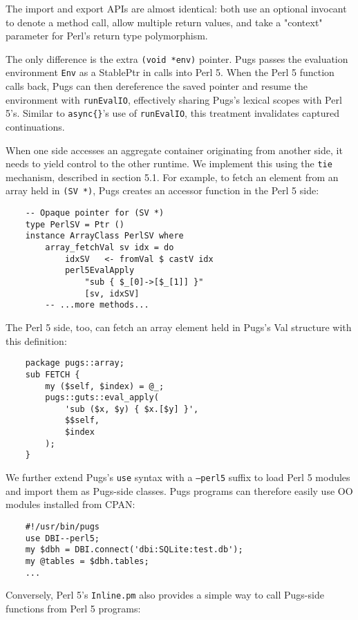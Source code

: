 \documentclass[]{sigplanconf}
\newcommand{\code}[1]{\texttt{#1}}
\begin{document}
The import and export APIs are almost identical: both use an optional invocant
to denote a method call, allow multiple return values, and take a "context"
parameter for Perl's return type polymorphism.

The only difference is the extra \code{(void *env)} pointer.  Pugs passes the
evaluation environment \code{Env} as a StablePtr in calls into Perl 5.  When
the Perl 5 function calls back, Pugs can then dereference the saved pointer and
resume the environment with \code{runEvalIO}, effectively sharing Pugs's
lexical scopes with Perl 5's.  Similar to \code{async\{\}}'s use of
\code{runEvalIO}, this treatment invalidates captured continuations.

When one side accesses an aggregate container originating from another side, it
needs to yield control to the other runtime.  We implement this using the
\code{tie} mechanism, described in section 5.1.  For example, to fetch an
element from an array held in \code{(SV *)}, Pugs creates an accessor function
in the Perl 5 side:

\begin{lstlisting}
    -- Opaque pointer for (SV *)
    type PerlSV = Ptr ()
    instance ArrayClass PerlSV where
        array_fetchVal sv idx = do
            idxSV   <- fromVal $ castV idx
            perl5EvalApply
                "sub { $_[0]->[$_[1]] }"
                [sv, idxSV]
        -- ...more methods...
\end{lstlisting}

The Perl 5 side, too, can fetch an array element held in Pugs's Val structure
with this definition:

\begin{lstlisting}
    package pugs::array;
    sub FETCH {
        my ($self, $index) = @_;
        pugs::guts::eval_apply(
            'sub ($x, $y) { $x.[$y] }',
            $$self,
            $index
        );
    }
\end{lstlisting}

We further extend Pugs's \code{use} syntax with a \code{--perl5} suffix to load
Perl 5 modules and import them as Pugs-side classes.  Pugs programs can
therefore easily use OO modules installed from CPAN:

\begin{lstlisting}
    #!/usr/bin/pugs
    use DBI--perl5;
    my $dbh = DBI.connect('dbi:SQLite:test.db');
    my @tables = $dbh.tables;
    ...
\end{lstlisting}

Conversely, Perl 5's \texttt{Inline.pm} also provides a simple way to call
Pugs-side functions from Perl 5 programs:
\end{document}
